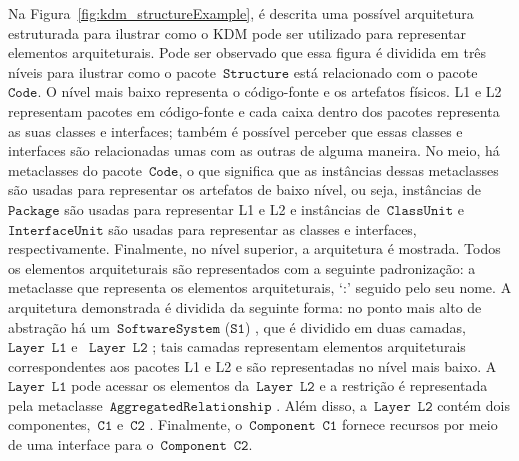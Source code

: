 Na Figura~\ref{fig:kdm_structureExample}, é descrita uma possível arquitetura estruturada para ilustrar como o KDM pode ser utilizado para representar elementos arquiteturais. Pode ser observado que essa figura é dividida em três níveis para ilustrar como o pacote~$\mathtt{Structure}$ está relacionado com o pacote~$\mathtt{Code}$. O nível mais baixo representa o código-fonte e os artefatos físicos. L1 e L2 representam pacotes em código-fonte e cada caixa dentro dos pacotes representa as suas classes e interfaces; também é possível perceber que essas classes e interfaces são relacionadas umas com as outras de alguma maneira. No meio, há metaclasses do pacote~$\mathtt{Code}$, o que significa que as instâncias dessas metaclasses são usadas para representar os artefatos de baixo nível, ou seja, instâncias de~$\mathtt{Package}$ são usadas para representar L1 e L2 e instâncias de~$\mathtt{ClassUnit}$ e~$\mathtt{InterfaceUnit}$ são usadas para representar as classes e interfaces, respectivamente. Finalmente, no nível superior, a arquitetura é mostrada. Todos os elementos arquiteturais são representados com a seguinte padronização: a metaclasse que representa os elementos arquiteturais, `:' seguido pelo seu nome. A arquitetura demonstrada é dividida da seguinte forma: no ponto mais alto de abstração há um~$\mathtt{SoftwareSystem}$ ($\mathtt{S1}$) , que é dividido em duas camadas, ~$\mathtt{Layer}$~$\mathtt{L1}$  e ~$\mathtt{Layer}$~$\mathtt{L2}$ ; tais camadas representam elementos arquiteturais correspondentes aos pacotes L1 e L2 e são representadas no nível mais baixo. A~$\mathtt{Layer}$~$\mathtt{L1}$ pode acessar os elementos da~$\mathtt{Layer}$~$\mathtt{L2}$ e a restrição  é representada pela metaclasse~$\mathtt{AggregatedRelationship}$ . Além disso, a~$\mathtt{Layer}$~$\mathtt{L2}$ contém dois componentes,~$\mathtt{C1}$  e~$\mathtt{C2}$ . Finalmente, o~$\mathtt{Component}$~$\mathtt{C1}$ fornece recursos por meio de uma interface para o~$\mathtt{Component}$~$\mathtt{C2}$.

